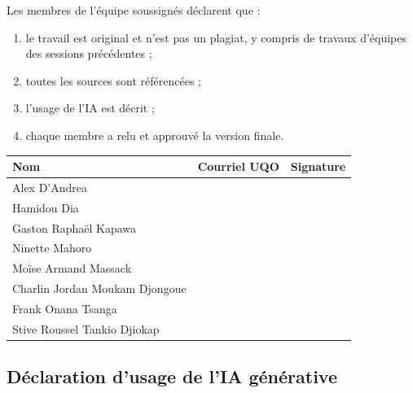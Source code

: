 Les membres de l'équipe soussignés déclarent que :
\begin{enumerate}[label=\arabic*.]
  \item le travail est original et n'est pas un plagiat, y compris de travaux d'équipes des sessions précédentes ;
  \item toutes les sources sont référencées ;
  \item l'usage de l'IA est décrit ;
  \item chaque membre a relu et approuvé la version finale.
\end{enumerate}

{\renewcommand{\arraystretch}{1.3}
\noindent\begin{tabularx}{\linewidth}{@{}>{\raggedright\arraybackslash}p{4.5cm}Xp{4cm}@{}}
\toprule
\textbf{Nom} & \textbf{Courriel UQO} & \textbf{Signature} \\
\midrule
\rule{0pt}{2em}Alex D'Andrea & & \\ \midrule
\rule{0pt}{2em}Hamidou Dia & & \\ \midrule
\rule{0pt}{2em}Gaston Raphaël Kapawa & & \\ \midrule
\rule{0pt}{2em}Ninette Mahoro & & \\ \midrule
\rule{0pt}{2em}Moïse Armand Massack & & \\ \midrule
\rule{0pt}{2em}Charlin Jordan Moukam Djongoue & & \\ \midrule
\rule{0pt}{2em}Frank Onana Tsanga & & \\ \midrule
\rule{0pt}{2em}Stive Roussel Tankio Djiokap & & \\
\bottomrule
\end{tabularx}\par}

\subsection*{Déclaration d'usage de l'IA générative}
\label{ann:ia}

